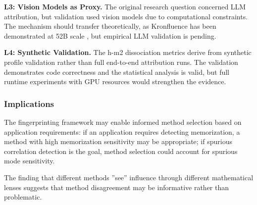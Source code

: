 \textbf{L3: Vision Models as Proxy.} The original research question concerned LLM attribution, but validation used vision models due to computational constraints. The mechanism should transfer theoretically, as Kronfluence has been demonstrated at 52B scale \citep{grosse2023kronfluence}, but empirical LLM validation is pending.

\textbf{L4: Synthetic Validation.} The h-m2 dissociation metrics derive from synthetic profile validation rather than full end-to-end attribution runs. The validation demonstrates code correctness and the statistical analysis is valid, but full runtime experiments with GPU resources would strengthen the evidence.

\subsubsection{Implications}

The fingerprinting framework may enable informed method selection based on application requirements: if an application requires detecting memorization, a method with high memorization sensitivity may be appropriate; if spurious correlation detection is the goal, method selection could account for spurious mode sensitivity.

The finding that different methods ''see'' influence through different mathematical lenses suggests that method disagreement may be informative rather than problematic.

